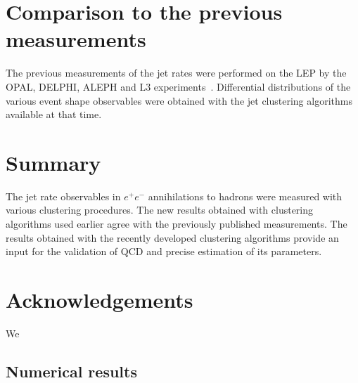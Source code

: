 \section{Comparison to the previous measurements}                      
\label{sec:comparison}
The previous measurements of the jet rates were performed on the LEP by 
the OPAL, DELPHI, ALEPH and L3 experiments~\cite{Alexander:1996kh,
Ackerstaff:1997kk,Acton:1992fa,Akrawy:1989rg,Heister:2003aj,Abdallah:2003xz,Achard:2004sv}.
Differential distributions of the various event shape observables were 
obtained with the jet clustering algorithms available at that  time.
\section{Summary}                      
\label{sec:summary}
The jet rate observables  in $e^+e^-$ 
annihilations to hadrons were measured with various clustering procedures.
The new results obtained with 
clustering algorithms  used earlier agree with the previously published measurements.
The results obtained with the recently developed clustering algorithms  
provide an input for the validation of QCD and precise estimation of its parameters.
%
\section*{Acknowledgements}
\label{sec:acknowledgements}
We
\FloatBarrier
\begin{appendices}
\section{Numerical results}
\label{sec:appendixA}


\renewcommand{\TABGFONTSIZE}{\scriptsize}
\newarray\TABGCAPTIONcorrected
{}
\newarray\TABGCAPTIONolddata
{}

%

\end{appendices}
